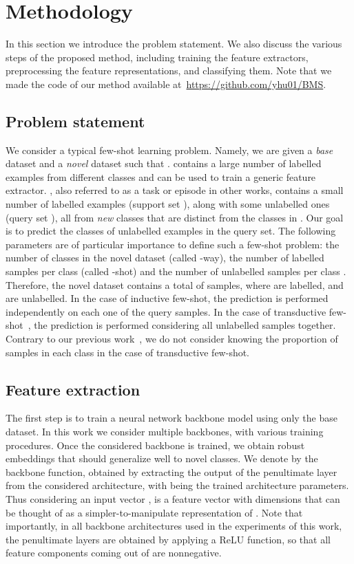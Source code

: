 \documentclass[review]{elsarticle}
\begin{document}
\section{Methodology}
\label{methodology}

In this section we introduce the problem statement. We also discuss the various steps of the proposed method, including training the feature extractors, preprocessing the feature representations, and classifying them. Note that we made the code of our method available at~\url{https://github.com/yhu01/BMS}.

\subsection{Problem statement}

We consider a typical few-shot learning problem. Namely, we are given a \emph{base} dataset  and a \emph{novel} dataset  such that .  contains a large number of labelled examples from  different classes and can be used to train a generic feature extractor. , also referred to as a task or episode in other works, contains a small number of labelled examples (support set ), along with some unlabelled ones (query set ), all from  \emph{new} classes that are distinct from the  classes in . Our goal is to predict the classes of unlabelled examples in the query set. The following parameters are of particular importance to define such a few-shot problem: the number of classes in the novel dataset  (called -way), the number of labelled samples per class  (called -shot) and the number of unlabelled samples per class . Therefore, the novel dataset contains a total of  samples, where  are labelled, and  are unlabelled.
In the case of inductive few-shot, the prediction is performed independently on each one of the query samples. In the case of transductive few-shot~\cite{DBLP:conf/iclr/LiuLPKYHY19, lichtenstein2020tafssl}, the prediction is performed considering all unlabelled samples together. Contrary to our previous work~\cite{hu2021leveraging}, we do not consider knowing the proportion of samples in each class in the case of transductive few-shot.

\subsection{Feature extraction}

The first step is to train a neural network backbone model using only the base dataset. In this work we consider multiple backbones, with various training procedures. Once the considered backbone is trained, we obtain robust embeddings that should generalize well to novel classes. We denote by  the backbone function, obtained by extracting the output of the penultimate layer from the considered architecture, with  being the trained architecture parameters. Thus considering an input vector ,  is a feature vector with  dimensions that can be thought of as a simpler-to-manipulate representation of .
Note that importantly, in all backbone architectures used in the experiments of this work, the penultimate layers are obtained by applying a ReLU function, so that all feature components coming out of  are nonnegative.
\end{document}
